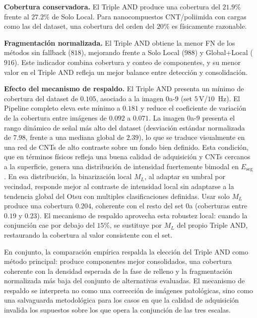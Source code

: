 \textbf{Cobertura conservadora.} El Triple AND produce una cobertura del $21.9\%$ frente al $27.2\%$ de Solo Local. Para nanocompuestos CNT/poliimida con cargas como las del dataset, una cobertura del orden del $20\%$ es físicamente razonable.
 
\textbf{Fragmentación normalizada.} El Triple AND obtiene la menor FN de los métodos sin fallback ($818$), mejorando frente a Solo Local ($988$) y Global+Local ($916$). Este indicador combina cobertura y conteo de componentes, y su menor valor en el Triple AND refleja un mejor balance entre detección y consolidación.
 
\textbf{Efecto del mecanismo de respaldo.} El Triple AND presenta un mínimo de cobertura del dataset de $0.105$, asociado a la imagen 0a-9 (set $5\, \text{V}$/$10$~Hz). El Pipeline completo eleva este mínimo a $0.181$ y reduce el coeficiente de variación de la cobertura entre imágenes de $0.092$ a $0.071$. 
La imagen 0a-9 presenta el rango dinámico de señal más alto del dataset 
(desviación estándar normalizada de $7.98$, frente a una mediana global de $2.39$), 
lo que se traduce visualmente en una red de CNTs de alto contraste sobre un fondo bien definido. Esta condición, que en términos físicos refleja una buena calidad de adquisición y CNTs cercanos a la superficie, genera una distribución de intensidad fuertemente 
bimodal en $E_{\text{seg}}$. En esa distribución, la binarización local $M_L$, al adaptar su umbral por vecindad, responde mejor al contraste de intensidad local sin adaptarse a la tendencia global del Otsu con multiples clasificaciones definidas.  Usar solo $M_L$ produce una cobertura $0.204$, coherente con el resto 
del set 0a (coberturas entre $0.19$ y $0.23$). El mecanismo de respaldo aprovecha esta robustez local: cuando la conjunción cae 
por debajo del $15\%$, se sustituye por $M_L$ del propio Triple AND, restaurando 
la cobertura al valor consistente con el set.



En conjunto, la comparación empírica respalda la elección del Triple AND como método principal: produce componentes mejor consolidados, una cobertura coherente con la densidad esperada de la fase de relleno y la fragmentación normalizada más baja del conjunto de alternativas evaluadas. El mecanismo de respaldo se interpreta no como una corrección de imágenes patológicas, sino como una salvaguarda metodológica para los casos en que la calidad de adquisición invalida los supuestos sobre los que opera la conjunción de las tres escalas.

